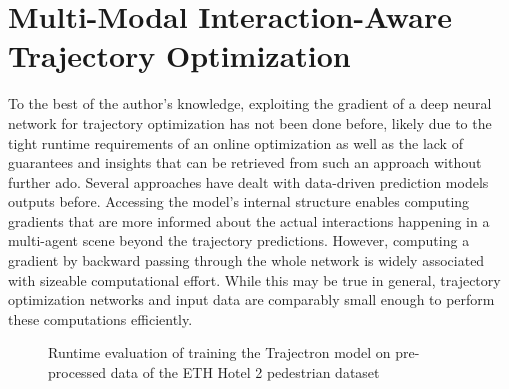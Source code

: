 \chapter{Multi-Modal Interaction-Aware Trajectory Optimization}
\label{text:approach}

To the best of the author's knowledge, exploiting the gradient of a deep neural network for trajectory optimization has not been done before, likely due to the tight runtime requirements of an online optimization as well as the lack of guarantees and insights that can be retrieved from such an approach without further ado. Several approaches have dealt with data-driven prediction models outputs before. Accessing the model's internal structure enables computing gradients that are more informed about the actual interactions happening in a multi-agent scene beyond the trajectory predictions. However, computing a gradient by backward passing through the whole network is widely associated with sizeable computational effort. While this may be true in general, trajectory optimization networks and input data are comparably small enough to perform these computations efficiently. 

\begin{figure}[!ht]
\begin{center}
\end{center}
\caption{Runtime evaluation of training the Trajectron model \cite{Salzmann2020} on pre-processed data of the ETH Hotel 2 pedestrian dataset \cite{Pellegrini2009}}
\label{img:training_runtime}
\end{figure}

